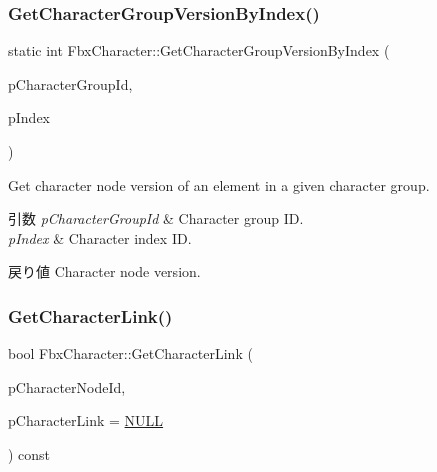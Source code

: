 \subsubsection{\texorpdfstring{Get\+Character\+Group\+Version\+By\+Index()}{GetCharacterGroupVersionByIndex()}}
{\footnotesize\ttfamily static int Fbx\+Character\+::\+Get\+Character\+Group\+Version\+By\+Index (\begin{DoxyParamCaption}\item[{\hyperlink{class_fbx_character_aa04f2d3cc99d77fe7b9d2066fc9f255e}{E\+Group\+Id}}]{p\+Character\+Group\+Id,  }\item[{int}]{p\+Index }\end{DoxyParamCaption})\hspace{0.3cm}{\ttfamily [static]}}

Get character node version of an element in a given character group. 
\begin{DoxyParams}{引数}
{\em p\+Character\+Group\+Id} & Character group ID. \\
\hline
{\em p\+Index} & Character index ID. \\
\hline
\end{DoxyParams}
\begin{DoxyReturn}{戻り値}
Character node version. 
\end{DoxyReturn}
\mbox{\label{class_fbx_character_a556ef97158eecdedc32ba8175943d637}} 
\subsubsection{\texorpdfstring{Get\+Character\+Link()}{GetCharacterLink()}}
{\footnotesize\ttfamily bool Fbx\+Character\+::\+Get\+Character\+Link (\begin{DoxyParamCaption}\item[{\hyperlink{class_fbx_character_ad75bf42026e435ac0ff4d7ece2317be4}{E\+Node\+Id}}]{p\+Character\+Node\+Id,  }\item[{\hyperlink{class_fbx_character_link}{Fbx\+Character\+Link} $\ast$}]{p\+Character\+Link = {\ttfamily \hyperlink{fbxarch_8h_a070d2ce7b6bb7e5c05602aa8c308d0c4}{N\+U\+LL}} }\end{DoxyParamCaption}) const}

